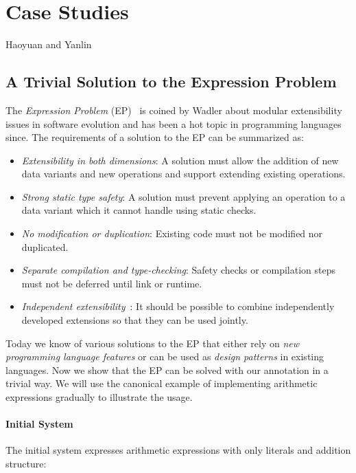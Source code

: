 \section{Case Studies}
Haoyuan and Yanlin

\subsection{A Trivial Solution to the Expression Problem}

The \emph{Expression Problem} (EP)~\cite{wadler98expression-problem} is coined
by Wadler about modular extensibility issues in software evolution and has been
a hot topic in programming languages since. The requirements of a solution to
the EP can be summarized as: 
\begin{itemize}
\item \emph{Extensibility in both dimensions}: A solution must allow
  the addition of new data variants and new operations and support
  extending existing operations.
\item \emph{Strong static type safety}: A solution must prevent
  applying an operation to a data variant which it cannot handle using
  static checks.
\item \emph{No modification or duplication}: Existing code must not be
  modified nor duplicated.
\item \emph{Separate compilation and type-checking}: Safety checks or
  compilation steps must not be deferred until link or runtime.
\item \emph{Independent extensibility}~\cite{zenger05independentlyextensible}:
  It should be possible to combine independently developed extensions so that
  they can be used jointly.
\end{itemize}

Today we know of various solutions to the EP that either rely on \emph{new
  programming language features}
or can be used as \emph{design patterns}%
in existing languages.
Now we show that the EP can be solved with our \mixin annotation in a trivial
way. We will use the canonical example of implementing arithmetic expressions
gradually to illustrate the usage.

\paragraph{Initial System}
The initial system expresses arithmetic expressions with only literals and
addition structure:

